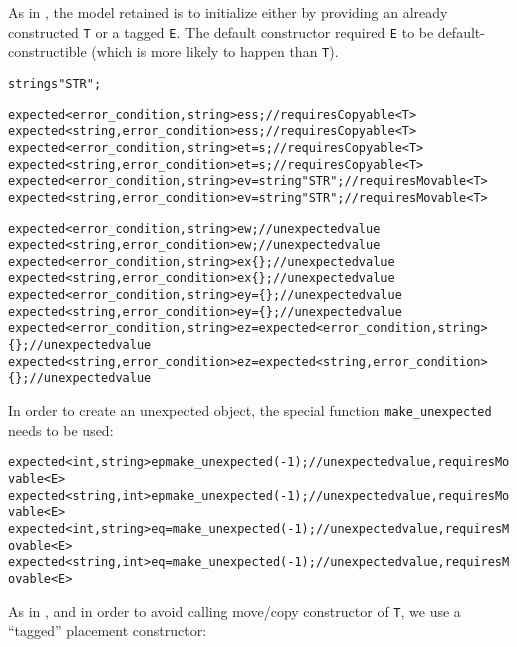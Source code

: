 \documentclass[a4paper,10pt]{article}
\newcommand{\cpp}[1]{\lstinline{#1}}
\newcommand{\suppress}[1]{\colorbox{suppress_color}{#1}}
\newcommand{\update}[1]{\colorbox{update_color}{#1}}
\begin{document}
\noindent
As in \cite{OptionalRev4}, the model retained is to initialize either by providing an already constructed \cpp{T} or a tagged \cpp{E}. The default constructor required \cpp{E} to be default-constructible (which is more likely to happen than \cpp{T}).

\begin{alltt}
string s{"STR"};

\suppress{expected<error_condition,string> es{s};              // requires Copyable<T>}
\update{expected<string, error_condition> es{s};              // requires Copyable<T>}
\suppress{expected<error_condition,string> et = s;             // requires Copyable<T>}
\update{expected<string, error_condition> et = s;             // requires Copyable<T>}
\suppress{expected<error_condition,string> ev = string{"STR"}; // requires Movable<T>}
\update{expected<string, error_condition> ev = string{"STR"}; // requires Movable<T>}

\suppress{expected<error_condition,string> ew;                 // unexpected value}
\update{expected<string, error_condition> ew;                 // unexpected value}
\suppress{expected<error_condition,string> ex\{\};               // unexpected value}
\update{expected<string, error_condition> ex\{\};               // unexpected value}
\suppress{expected<error_condition,string> ey = \{\};            // unexpected value}
\update{expected<string, error_condition> ey = \{\};            // unexpected value}
\suppress{expected<error_condition,string> ez = expected<error_condition,string>\{\};  // unexpected value}
\update{expected<string,error_condition> ez = expected<string,error_condition>\{\};  // unexpected value}
\end{alltt}

\noindent
In order to create an unexpected object, the special function \cpp{make_unexpected} needs to be used:

\begin{alltt}
\suppress{expected<int, string> ep{make_unexpected(-1)};    // unexpected value, requires Movable<E>}
\update{expected<string, int> ep{make_unexpected(-1)};    // unexpected value, requires Movable<E>}
\suppress{expected<int, string> eq = make_unexpected(-1);   // unexpected value, requires Movable<E>}
\update{expected<string, int> eq = make_unexpected(-1);   // unexpected value, requires Movable<E>}
\end{alltt}

\noindent
As in \cite{OptionalRev4}, and in order to avoid calling move/copy constructor of \cpp{T}, we use a ``tagged'' placement constructor: 
\end{document}
